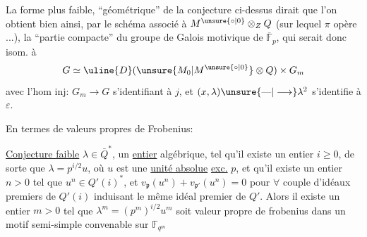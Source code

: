 
La forme plus faible, ``géométrique'' de la conjecture ci-dessus dirait que  l'on obtient bien ainsi, par le schéma associé à $M^{\unsure{\circ|0}}\otimes_ZQ$ (sur lequel $\pi$ opère ...), la  ``partie compacte'' du  groupe de Galois motivique de $\overline{\mathbb F}_p$, qui serait donc isom. à
\[
G\simeq\uline{D}(\unsure{M_0|M^{\unsure{\circ|0}}}\otimes Q)\times G_m
\]
avec l'hom inj: $G_m\longrightarrow G$ s'identifiant à $j$, et  $(x,\lambda)\unsure{\text{—}|\longrightarrow}\lambda^2$ s'identifie à $\varepsilon$.

En termes de valeurs propres de Frobenius:


\uline{Conjecture faible}  $\lambda\in\bar Q^*$,  un \uline{entier} algébrique,  tel qu'il existe un entier $i\geq0$, de sorte que $\lambda=p^{i/2}u$,  où $u$ est une \uline{unité absolue} \uline{exc.} $p$, et qu'il existe un entier $n>0$ tel que $u^n\in Q'(i)^*$, et $v_{\mathfrak p}(u^n)+v_{\mathfrak p'}(u^n)=0$ pour $\forall$ couple d'idéaux premiers de $Q'(i)$ induisant le même idéal premier de $Q'$. Alors il existe un entier $m>0$ tel que $\lambda^m=(p^m)^{i/2}u^m$ soit  valeur propre de frobenius  dans un motif semi-simple  convenable sur $\mathbb F_{q^m}$


